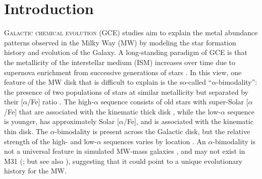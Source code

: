 \documentclass[twocolumn,twocolappendix]{aastex701}
\newcommand{\aFe}{[$\alpha$/Fe]\xspace}
\begin{document}
\section{Introduction}
\label{sec:introduction}

\lettrine{G}{alactic chemical evolution} (GCE) studies aim to explain the metal abundance patterns observed in the Milky Way (MW) by modeling the star formation history and evolution of the Galaxy. A long-standing paradigm of GCE is that the metallicity of the interstellar medium (ISM) increases over time due to supernova enrichment from successive generations of stars \citep[e.g.,][]{tinsley_stellar_1979,matteucci_relative_1986}. In this view, one feature of the MW disk that is difficult to explain is the so-called ``$\alpha$-bimodality'': the presence of two populations of stars at similar metallicity but separated by their \aFe ratio \citep[e.g.,][]{bensby_exploring_2014}. The high-$\alpha$ sequence consists of old stars \citep[$\gtrsim9$ Gyr; e.g.,][]{pinsonneault_apokasc-3_2025} with super-Solar \aFe that are associated with the kinematic thick disk \citep[e.g.,][]{fuhrmann_nearby_1998}, while the low-$\alpha$ sequence is younger, has approximately Solar \aFe, and is associated with the kinematic thin disk. The $\alpha$-bimodality is present across the Galactic disk, but the relative strength of the high- and low-$\alpha$ sequences varies by location \citep{hayden_chemical_2015}. An $\alpha$-bimodality is not a universal feature in simulated MW-mass galaxies \citep[e.g.,][]{mackereth_origin_2018,parul_effect_2025}, and may not exist in M31 (\citealt{nidever_prevalence_2024}; but see also \citealt{kobayashi_fe_2023}), suggesting that it could point to a unique evolutionary history for the MW.
\end{document}

